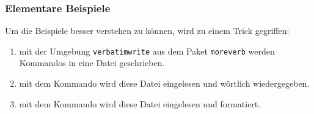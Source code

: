 \documentclass[ngerman,               %
               a4paper,               %
               fleqn,                 %
                     ]{scrartcl}       %
\begin{document}
\subsubsection{Elementare Beispiele}
\label{sec:elementare-beispiele}

Um die Beispiele besser verstehen zu können, wird zu einem Trick gegriffen:
\begin{enumerate}
  \item mit der Umgebung \texttt{verbatimwrite} aus dem Paket \texttt{moreverb}
    werden Kommandos in eine Datei geschrieben.
  \item mit dem Kommando \lstinline|| wird diese Datei
    eingelesen und wörtlich wiedergegeben.
  \item mit dem Kommando \lstinline|| wird diese Datei
    eingelesen und formatiert.
\end{enumerate}
\end{document}
